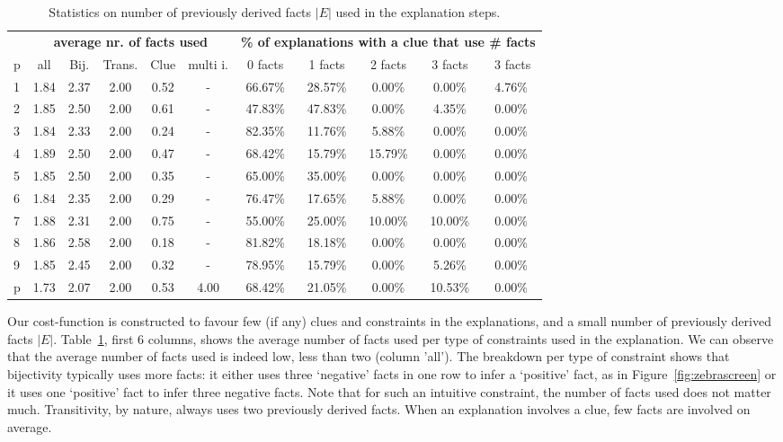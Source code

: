 \begin{table}[t]
	\centering
	\begin{tabular}{l|c|cccc|ccccc}
		  & \multicolumn{5}{c|}{\bf average nr. of facts used} & \multicolumn{5}{c}{\bf \% of explanations with a clue that use \# facts}                                                                                \\
		p & all &  Bij. & Trans. &  Clue & multi i. & 0 facts & 1 facts & 2 facts & 3 facts & $\>$3 facts \\\hline
		1 &  1.84 &  2.37 &   2.00 &  0.52 &        - &  66.67\% &  28.57\% &   0.00\% &   0.00\% &    4.76\% \\
		2 &  1.85 &  2.50 &   2.00 &  0.61 &        - &  47.83\% &  47.83\% &   0.00\% &   4.35\% &    0.00\% \\
		3 &  1.84 &  2.33 &   2.00 &  0.24 &        - &  82.35\% &  11.76\% &   5.88\% &   0.00\% &    0.00\% \\
		4 &  1.89 &  2.50 &   2.00 &  0.47 &        - &  68.42\% &  15.79\% &  15.79\% &   0.00\% &    0.00\% \\
		5 &  1.85 &  2.50 &   2.00 &  0.35 &        - &  65.00\% &  35.00\% &   0.00\% &   0.00\% &    0.00\% \\
		6 &  1.84 &  2.35 &   2.00 &  0.29 &        - &  76.47\% &  17.65\% &   5.88\% &   0.00\% &    0.00\% \\
		7 &  1.88 &  2.31 &   2.00 &  0.75 &        - &  55.00\% &  25.00\% &  10.00\% &  10.00\% &    0.00\% \\
		8 &  1.86 &  2.58 &   2.00 &  0.18 &        - &  81.82\% &  18.18\% &   0.00\% &   0.00\% &    0.00\% \\
		9 &  1.85 &  2.45 &   2.00 &  0.32 &        - &  78.95\% &  15.79\% &   0.00\% &   5.26\% &    0.00\% \\
		p &  1.73 &  2.07 &   2.00 &  0.53 &     4.00 &  68.42\% &  21.05\% &   0.00\% &  10.53\% &    0.00\% \\
	\end{tabular}
	\caption{Statistics on number of previously derived facts $|E|$ used in the explanation steps.}
 	\label{table:sequence_leve}
\end{table}
Our cost-function is constructed to favour few (if any) clues and constraints in the explanations, and a small number of previously derived facts $|E|$.
Table~\ref{table:sequence_leve}, first 6 columns, shows the average number of facts used per type of constraints used in the explanation.
We can observe that the average number of facts used is indeed low, less than two (column 'all').
The breakdown per type of constraint shows that bijectivity typically uses more facts: it either uses three `negative' facts in one row to infer a `positive' fact, as in Figure~\ref{fig:zebrascreen} or it uses one `positive' fact to infer three negative facts.
Note that for such an intuitive constraint, the number of facts used does not matter much. Transitivity, by nature, always uses two previously derived facts.
When an explanation involves a clue, few facts are involved on average. 

